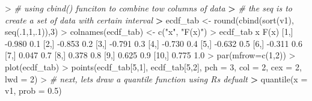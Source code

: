 \documentclass[
]{article}
\newenvironment{Shaded}{\begin{snugshade}}{\end{snugshade}}
\newcommand{\AttributeTok}[1]{\textcolor[rgb]{0.77,0.63,0.00}{#1}}
\newcommand{\CommentTok}[1]{\textcolor[rgb]{0.56,0.35,0.01}{\textit{#1}}}
\newcommand{\DecValTok}[1]{\textcolor[rgb]{0.00,0.00,0.81}{#1}}
\newcommand{\ErrorTok}[1]{\textcolor[rgb]{0.64,0.00,0.00}{\textbf{#1}}}
\newcommand{\FloatTok}[1]{\textcolor[rgb]{0.00,0.00,0.81}{#1}}
\newcommand{\FunctionTok}[1]{\textcolor[rgb]{0.00,0.00,0.00}{#1}}
\newcommand{\NormalTok}[1]{#1}
\newcommand{\OtherTok}[1]{\textcolor[rgb]{0.56,0.35,0.01}{#1}}
\newcommand{\SpecialCharTok}[1]{\textcolor[rgb]{0.00,0.00,0.00}{#1}}
\newcommand{\StringTok}[1]{\textcolor[rgb]{0.31,0.60,0.02}{#1}}
\begin{document}
\begin{Shaded}
\begin{Highlighting}[]
\SpecialCharTok{\textgreater{}} \CommentTok{\# using cbind() funciton to combine tow columns of data}
\ErrorTok{\textgreater{}} \CommentTok{\# the seq is to create a set of data with certain interval}
\ErrorTok{\textgreater{}}\NormalTok{ ecdf\_tab }\OtherTok{\textless{}{-}} \FunctionTok{round}\NormalTok{(}\FunctionTok{cbind}\NormalTok{(}\FunctionTok{sort}\NormalTok{(v1), }\FunctionTok{seq}\NormalTok{(.}\DecValTok{1}\NormalTok{,}\DecValTok{1}\NormalTok{,.}\DecValTok{1}\NormalTok{)),}\DecValTok{3}\NormalTok{)}
\SpecialCharTok{\textgreater{}} \FunctionTok{colnames}\NormalTok{(ecdf\_tab) }\OtherTok{\textless{}{-}} \FunctionTok{c}\NormalTok{(}\StringTok{"x"}\NormalTok{, }\StringTok{"F(x)"}\NormalTok{)}
\SpecialCharTok{\textgreater{}}\NormalTok{ ecdf\_tab}
\NormalTok{           x }\FunctionTok{F}\NormalTok{(x)}
\NormalTok{ [}\DecValTok{1}\NormalTok{,] }\SpecialCharTok{{-}}\FloatTok{0.980}  \FloatTok{0.1}
\NormalTok{ [}\DecValTok{2}\NormalTok{,] }\SpecialCharTok{{-}}\FloatTok{0.853}  \FloatTok{0.2}
\NormalTok{ [}\DecValTok{3}\NormalTok{,] }\SpecialCharTok{{-}}\FloatTok{0.791}  \FloatTok{0.3}
\NormalTok{ [}\DecValTok{4}\NormalTok{,] }\SpecialCharTok{{-}}\FloatTok{0.730}  \FloatTok{0.4}
\NormalTok{ [}\DecValTok{5}\NormalTok{,] }\SpecialCharTok{{-}}\FloatTok{0.632}  \FloatTok{0.5}
\NormalTok{ [}\DecValTok{6}\NormalTok{,] }\SpecialCharTok{{-}}\FloatTok{0.311}  \FloatTok{0.6}
\NormalTok{ [}\DecValTok{7}\NormalTok{,]  }\FloatTok{0.047}  \FloatTok{0.7}
\NormalTok{ [}\DecValTok{8}\NormalTok{,]  }\FloatTok{0.378}  \FloatTok{0.8}
\NormalTok{ [}\DecValTok{9}\NormalTok{,]  }\FloatTok{0.625}  \FloatTok{0.9}
\NormalTok{[}\DecValTok{10}\NormalTok{,]  }\FloatTok{0.775}  \FloatTok{1.0}
\SpecialCharTok{\textgreater{}} \FunctionTok{par}\NormalTok{(}\AttributeTok{mfrow=}\FunctionTok{c}\NormalTok{(}\DecValTok{1}\NormalTok{,}\DecValTok{2}\NormalTok{))}
\SpecialCharTok{\textgreater{}} \FunctionTok{plot}\NormalTok{(ecdf\_tab)}
\SpecialCharTok{\textgreater{}} \FunctionTok{points}\NormalTok{(ecdf\_tab[}\DecValTok{5}\NormalTok{,}\DecValTok{1}\NormalTok{], ecdf\_tab[}\DecValTok{5}\NormalTok{,}\DecValTok{2}\NormalTok{], }\AttributeTok{pch =} \DecValTok{3}\NormalTok{, }\AttributeTok{col =} \DecValTok{2}\NormalTok{, }\AttributeTok{cex =} \DecValTok{2}\NormalTok{, }\AttributeTok{lwd =} \DecValTok{2}\NormalTok{)}
\SpecialCharTok{\textgreater{}} \CommentTok{\# next, lets draw a quantile function using R\textquotesingle{}s defualt}
\ErrorTok{\textgreater{}} \FunctionTok{quantile}\NormalTok{(}\AttributeTok{x =}\NormalTok{ v1, }\AttributeTok{prob =} \FloatTok{0.5}\NormalTok{)}

\end{Highlighting}
\end{Shaded}
\end{document}
